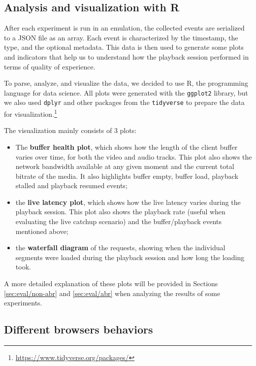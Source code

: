 \subsection{Analysis and visualization with R}
\label{sec:eval/testbed/dataviz}

After each experiment is run in an emulation, the collected events are serialized to a JSON file as an array. Each event is characterized by the timestamp, the type, and the optional metadata. This data is then used to generate some plots and indicators that help us to understand how the playback session performed in terms of quality of experience.

To parse, analyze, and visualize the data, we decided to use R, the programming language for data science. All plots were generated with the \texttt{ggplot2} library, but we also used \texttt{dplyr} and other packages from the \texttt{tidyverse} to prepare the data for visualization.\footnote{\url{https://www.tidyverse.org/packages/}}

The visualization mainly consists of 3 plots:

\begin{itemize}
    \item The \textbf{buffer health plot}, which shows how the length of the client buffer varies over time, for both the video and audio tracks. This plot also shows the network bandwidth available at any given moment and the current total bitrate of the media. It also highlights buffer empty, buffer load, playback stalled and playback resumed events;
    \item the \textbf{live latency plot}, which shows how the live latency varies during the playback session. This plot also shows the playback rate (useful when evaluating the live catchup scenario) and the buffer/playback events mentioned above;
    \item the \textbf{waterfall diagram} of the requests, showing when the individual segments were loaded during the playback session and how long the loading took.
\end{itemize}

A more detailed explanation of these plots will be provided in Sections \ref{sec:eval/non-abr} and \ref{sec:eval/abr} when analyzing the results of some experiments.

\subsection{Different browsers behaviors}
\label{sec:eval/browsers}

